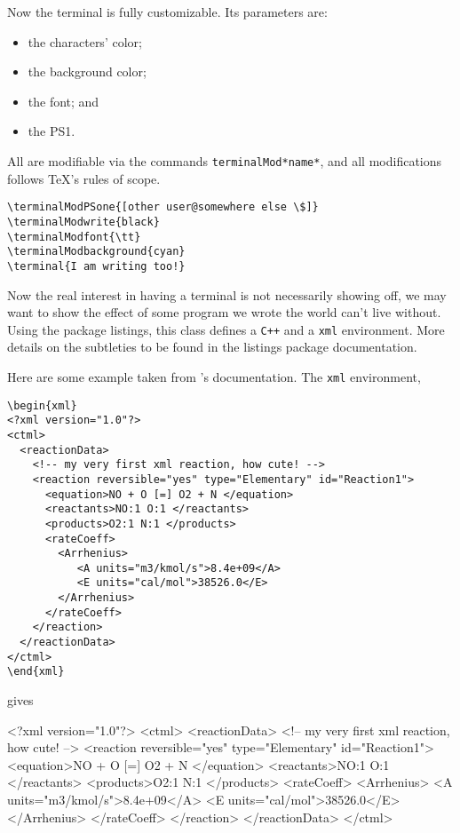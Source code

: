 \documentclass{documentation}
\begin{document}

Now the terminal is fully customizable. Its parameters are:
\begin{itemize}
\item the characters' color;
\item the background color;
\item the font; and
\item the PS1.
\end{itemize}
All are modifiable via the commands \verb!terminalMod*name*!,
and all modifications follows \TeX's rules of scope.
{
\begin{verbatim}
\terminalModPSone{[other user@somewhere else \$]}
\terminalModwrite{black}
\terminalModfont{\tt}
\terminalModbackground{cyan}
\terminal{I am writing too!}
\end{verbatim}
\terminalModfont{\tt}
}

Now the real interest in having a terminal is not
necessarily showing off, we may want to show the effect
of some program we wrote the world can't live without.
Using the package \textsf{listings}, this class defines
a \texttt{C++} and a \texttt{xml} environment. More
details on the subtleties to be found in the
\textsf{listings} package documentation.

Here are some example taken from \Antioch's documentation.
The \texttt{xml} environment,
\begin{verbatim}
\begin{xml}
<?xml version="1.0"?>
<ctml>
  <reactionData>
    <!-- my very first xml reaction, how cute! -->
    <reaction reversible="yes" type="Elementary" id="Reaction1">
      <equation>NO + O [=] O2 + N </equation>
      <reactants>NO:1 O:1 </reactants>
      <products>O2:1 N:1 </products>
      <rateCoeff>
        <Arrhenius>
           <A units="m3/kmol/s">8.4e+09</A>
           <E units="cal/mol">38526.0</E>
        </Arrhenius>
      </rateCoeff>
    </reaction>
  </reactionData>
</ctml>
\end{xml}
\end{verbatim}
gives
\begin{xml}
<?xml version="1.0"?>
<ctml>
  <reactionData>
    <!-- my very first xml reaction, how cute! -->
    <reaction reversible="yes" type="Elementary" id="Reaction1">
      <equation>NO + O [=] O2 + N </equation>
      <reactants>NO:1 O:1 </reactants>
      <products>O2:1 N:1 </products>
      <rateCoeff>
        <Arrhenius>
           <A units="m3/kmol/s">8.4e+09</A>
           <E units="cal/mol">38526.0</E>
        </Arrhenius>
      </rateCoeff>
    </reaction>
  </reactionData>
</ctml>
\end{xml}
\end{document}
